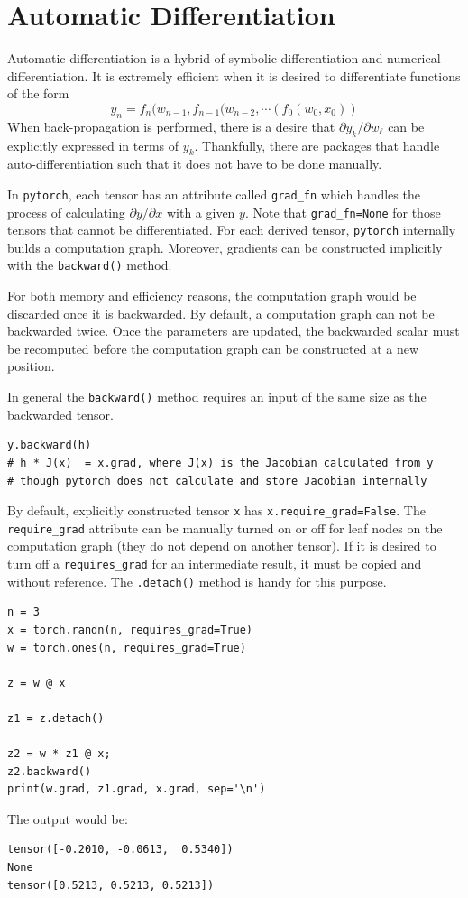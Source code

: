 \chapter{Automatic Differentiation}
Automatic differentiation is a hybrid of symbolic differentiation and numerical differentiation.
It is extremely efficient when it is desired to differentiate functions of the form
$$y_n=f_n(w_{n-1}, f_{n-1}(w_{n-2},\cdots (f_0(w_0, x_0)) $$
When back-propagation is performed, there is a desire that $\partial y_{k}/\partial w_{\ell}$ can be explicitly expressed in terms of $y_k$.
Thankfully, there are packages that handle auto-differentiation such that it does not have to be done manually.

In \texttt{pytorch}, each tensor has an attribute called \texttt{grad\_fn} which handles the process of calculating $\partial y/\partial x$ with a given $y$.
Note that \texttt{grad\_fn=None} for those tensors that cannot be differentiated.
For each derived tensor, \texttt{pytorch} internally builds a computation graph.
Moreover, gradients can be constructed implicitly with the \texttt{backward()} method.

For both memory and efficiency reasons, the computation graph would be discarded once it is backwarded.
By default, a computation graph can not be backwarded twice.
Once the parameters are updated, the backwarded scalar must be recomputed before the computation graph can be constructed at a new position.

In general the \texttt{backward()} method requires an input of the same size as the backwarded tensor.
\begin{verbatim}
y.backward(h)
# h * J(x)  = x.grad, where J(x) is the Jacobian calculated from y
# though pytorch does not calculate and store Jacobian internally
\end{verbatim}

By default, explicitly constructed tensor \texttt{x}
has \texttt{x.require\_grad=False}.
The \texttt{require\_grad} attribute can be manually turned on or off for leaf nodes on the computation graph (they do not depend on another tensor).
If it is desired to turn off a \texttt{requires\_grad} for an intermediate result, it must be copied and without reference.
The \texttt{.detach()} method is handy for this purpose.
\begin{verbatim}
n = 3
x = torch.randn(n, requires_grad=True)
w = torch.ones(n, requires_grad=True)

z = w @ x

z1 = z.detach()

z2 = w * z1 @ x;
z2.backward()
print(w.grad, z1.grad, x.grad, sep='\n')
\end{verbatim}
The output would be:
\begin{verbatim}
tensor([-0.2010, -0.0613,  0.5340])
None
tensor([0.5213, 0.5213, 0.5213])
\end{verbatim}

